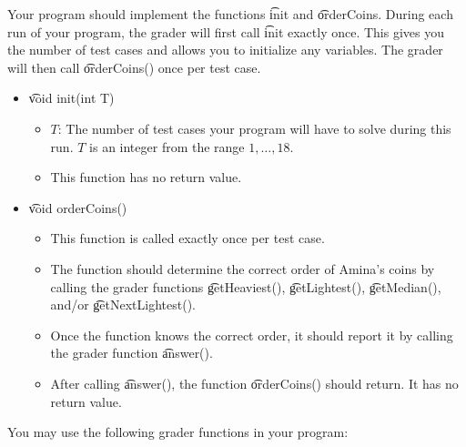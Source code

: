 Your program should implement the functions \t{init} and \t{orderCoins}. During each run of your program, the grader will first call \t{init} exactly once. This gives you the number of test cases and allows you to initialize any variables. The grader will then call \t{orderCoins()} once per test case.
\begin{itemize}
    \item \t{void init(int T)}
    \begin{itemize}
        \item $T$: The number of test cases your program will have to solve during this run. $T$ is an integer from the range $1,\dots,18$.
        \item This function has no return value.
    \end{itemize}
    \item \t{void orderCoins()}
    \begin{itemize}
        \item This function is called exactly once per test case.
        \item The function should determine the correct order of Amina's coins by calling the grader functions \t{getHeaviest()}, \t{getLightest()}, \t{getMedian()}, and/or \t{getNextLightest()}.
        \item Once the function knows the correct order, it should report it by calling the grader function \t{answer()}.
        \item After calling \t{answer()}, the function \t{orderCoins()} should return. It has no return value.
    \end{itemize}
\end{itemize}
You may use the following grader functions in your program:
